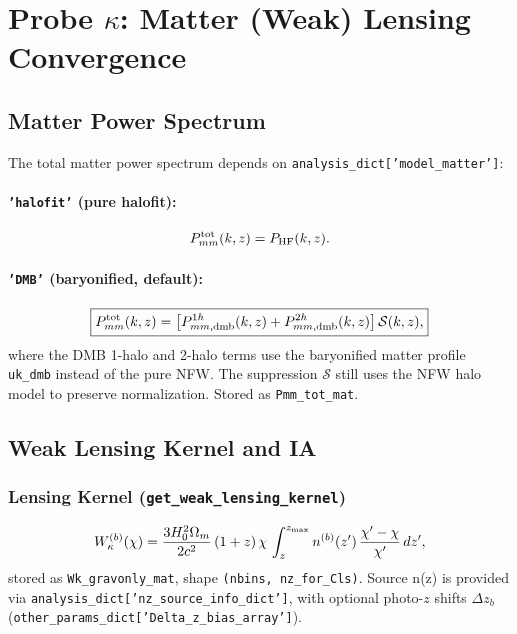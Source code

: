 \documentclass[12pt,a4paper]{article}
\newcommand{\code}[1]{\texttt{\small #1}}
\newcommand{\param}[1]{\texttt{\small #1}}
\begin{document}
\section{Probe $\kappa$: Matter (Weak) Lensing Convergence}
\label{sec:probek}

\subsection{Matter Power Spectrum}
\label{sec:Pmm}

The total matter power spectrum depends on
\param{analysis\_dict['model\_matter']}:

\paragraph{\code{'halofit'} (pure halofit):}
\begin{equation}
  P^{\rm tot}_{mm}(k,z) = P_{\rm HF}(k,z).
\end{equation}

\paragraph{\code{'DMB'} (baryonified, default):}
\begin{equation}
  \boxed{P^{\rm tot}_{mm}(k,z) = \left[P^{1h}_{mm,\rm dmb}(k,z) + P^{2h}_{mm,\rm dmb}(k,z)\right]\mathcal{S}(k,z),}
\end{equation}
where the DMB 1-halo and 2-halo terms use the baryonified matter profile
\code{uk\_dmb} instead of the pure NFW. The suppression $\mathcal{S}$ still uses
the NFW halo model to preserve normalization.
Stored as \code{Pmm\_tot\_mat}.

\subsection{Weak Lensing Kernel and IA}
\label{sec:wl}

\subsubsection{Lensing Kernel (\code{get\_weak\_lensing\_kernel})}
\begin{equation}
  W_\kappa^{(b)}(\chi) = \frac{3H_0^2\Omega_m}{2c^2}\,(1+z)\,\chi\,
  \int_z^{z_{\rm max}} n^{(b)}(z')\,\frac{\chi'-\chi}{\chi'}\,dz',
\end{equation}
stored as \code{Wk\_gravonly\_mat}, shape \code{(nbins, nz\_for\_Cls)}.
Source n(z) is provided via \param{analysis\_dict['nz\_source\_info\_dict']},
with optional photo-$z$ shifts $\Delta z_b$ (\param{other\_params\_dict['Delta\_z\_bias\_array']}).
\end{document}
